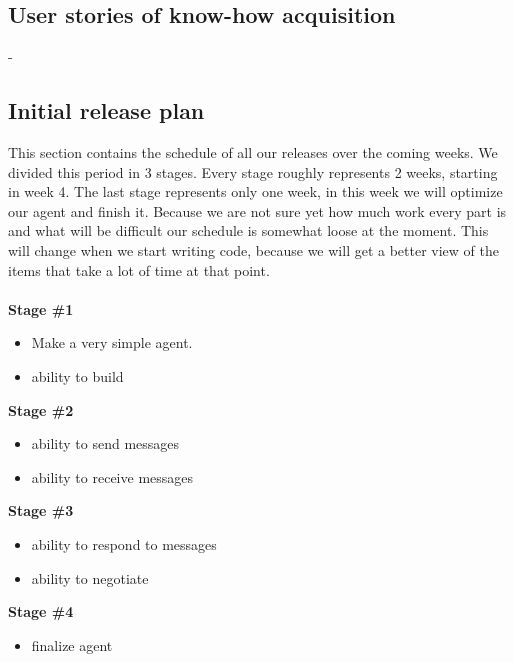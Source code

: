 \subsection{User stories of know-how acquisition}
-
\newpage
\subsection{Initial release plan}

This section contains the schedule of all our releases over the coming weeks. We divided this period in 3 stages. Every stage roughly represents 2 weeks, starting in week 4. The last stage represents only one week, in this week we will optimize our agent and finish it. Because we are not sure yet how much work every part is and what will be difficult our schedule is somewhat loose at the moment. This will change when we start writing code, because we will get a better view of the items that take a lot of time at that point.\\
\\

\textbf{Stage \#1}
\begin{itemize}
\item Make a very simple agent.
\item ability to build
\end{itemize}

\textbf{Stage \#2}
\begin{itemize}
\item ability to send messages
\item ability to receive messages
\end{itemize}

\textbf{Stage \#3}
\begin{itemize}
\item ability to respond to messages
\item ability to negotiate
\end{itemize}

\textbf{Stage \#4}
\begin{itemize}
\item finalize agent
\end{itemize}
